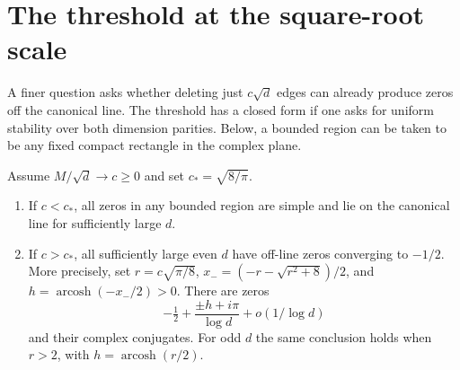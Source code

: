 \section{The threshold at the square-root scale}\label{sec:critical}
A finer question asks whether deleting just $c\sqrt d$ edges can
already produce zeros off the canonical line. The threshold has a
closed form if one asks for uniform stability over both dimension
parities. Below, a bounded region can be taken to be any fixed compact
rectangle in the complex plane.

\begin{theorem}\label{thm:critical}
Assume $M/\sqrt d\to c\ge0$ and set $c_*= \sqrt{8/\pi}$.
\begin{enumerate}
\item If $c<c_*$, all zeros in any bounded region are simple and lie on
the canonical line for sufficiently large $d$.
\item If $c>c_*$, all sufficiently large even $d$ have off-line zeros
converging to $-1/2$. More precisely, set $r=c\sqrt{\pi/8}$,
$x_-=(-r-\sqrt{r^2+8})/2$, and
$h=\operatorname{arcosh}(-x_-/2)>0$. There are zeros
\[
 -\tfrac12+\frac{\pm h+i\pi}{\log d}
                  +o(1/\log d)
\]
and their complex conjugates. For odd $d$ the same conclusion holds
when $r>2$, with $h=\operatorname{arcosh}(r/2)$.
\end{enumerate}
\end{theorem}


